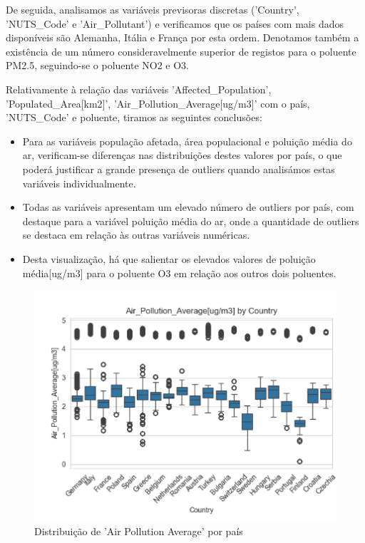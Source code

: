 \documentclass[conference]{IEEEtran}
\begin{document}
De seguida, analisamos as variáveis previsoras discretas ('Country', 'NUTS\_Code' e 'Air\_Pollutant') e verificamos que os países com mais dados disponíveis são Alemanha, Itália e França por esta ordem. Denotamos também a existência de um número consideravelmente superior de registos para o poluente PM2.5, seguindo-se o poluente NO2 e O3.

Relativamente à relação das variáveis 'Affected\_Population', 'Populated\_Area[km2]', 'Air\_Pollution\_Average[ug/m3]' com o país, 'NUTS\_Code' e poluente, tiramos as seguintes conclusões:
\begin{itemize}
	\item Para as variáveis população afetada, área populacional e poluição média do ar, verificam-se diferenças nas distribuições destes valores por país, o que poderá justificar a grande presença de outliers quando analisámos estas variáveis individualmente.
	\item Todas as variáveis apresentam um elevado número de outliers por país, com destaque para a variável poluição média do ar, onde a quantidade de outliers se destaca em relação às outras variáveis numéricas.
	\item Desta visualização, há que salientar os elevados valores de poluição média[ug/m3] para o poluente O3 em relação aos outros dois poluentes.  
\end{itemize}

\begin{figure}[H]
	\centering
	\includegraphics[width=0.8\linewidth]{AirPollutionAvgByCountry}
	\caption{Distribuição de 'Air Pollution Average' por país}
	\label{fig:AvgByCountry}
\end{figure}
\end{document}
